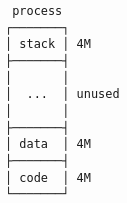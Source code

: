 \documentclass[varwidth,crop]{standalone}
\begin{document}
\begin{verbatim}
 process 
┌───────┐
│ stack │ 4M
├───────┤
│       │
│  ...  │ unused
│       │
├───────┤
│ data  │ 4M
├───────┤
│ code  │ 4M
└───────┘
\end{verbatim}
\end{document}
